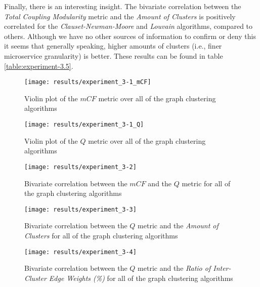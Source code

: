 \documentclass[12pt,a4paper]{report}
\begin{document}
Finally, there is an interesting insight. The bivariate correlation between
the \textit{Total Coupling Modularity} metric and the \textit{Amount of Clusters}
is positively correlated for the \textit{Clauset-Newman-Moore} and \textit{Louvain}
algorithms, compared to others. Although we have no other sources of information
to confirm or deny this it seems that generally speaking, higher amounts of clusters
(i.e., finer microservice granularity) is better.
These results can be found in table \ref{table:experiment-3.5}.

\begin{figure}[htbp]
\centering
\texttt{[image: results/experiment\_3-1\_mCF]}
\caption{Violin plot of the $mCF$ metric over all of the graph clustering algorithms}
\label{fig:experiment-3.1_mCF}
\end{figure}

\begin{figure}[htbp]
\centering
\texttt{[image: results/experiment\_3-1\_Q]}
\caption{Violin plot of the $Q$ metric over all of the graph clustering algorithms}
\label{fig:experiment-3.1_Q}
\end{figure}

\begin{figure}[htbp]
\centering
\texttt{[image: results/experiment\_3-2]}
\caption{Bivariate correlation between the $mCF$ and the $Q$ metric for all of the graph clustering algorithms}
\label{fig:experiment-3.2}
\end{figure}

\begin{figure}[htbp]
\centering
\texttt{[image: results/experiment\_3-3]}
\caption{Bivariate correlation between the $Q$ metric and the \textit{Amount of Clusters} for all of the graph clustering algorithms}
\label{fig:experiment-3.3}
\end{figure}

\begin{figure}[htbp]
\centering
\texttt{[image: results/experiment\_3-4]}
\caption{Bivariate correlation between the $Q$ metric and the \textit{Ratio of Inter-Cluster Edge Weights (\%)} for all of the graph clustering algorithms}
\label{fig:experiment-3.4}
\end{figure}
\end{document}
